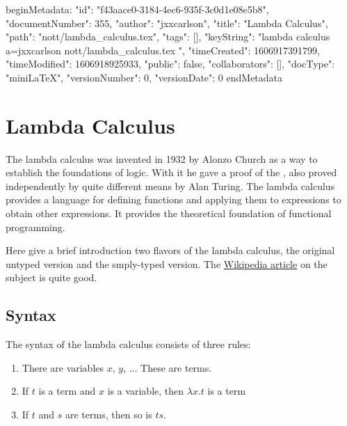 beginMetadata:
{
    "id": "f43aace0-3184-4ec6-935f-3c0d1e08e5b8",
    "documentNumber": 355,
    "author": "jxxcarlson",
    "title": "Lambda Calculus",
    "path": "nott/lambda_calculus.tex",
    "tags": [],
    "keyString": "lambda calculus a=jxxcarlson nott/lambda_calculus.tex ",
    "timeCreated": 1606917391799,
    "timeModified": 1606918925933,
    "public": false,
    "collaborators": [],
    "docType": "miniLaTeX",
    "versionNumber": 0,
    "versionDate": 0
}
endMetadata

\setcounter{section}{4}

\section{Lambda Calculus}


\innertableofcontents

The lambda calculus was invented in 1932 by Alonzo Church as a way to establish the foundations of logic.  With it he gave a proof of the , also proved independently by quite different means by Alan Turing.  The lambda calculus provides a language for defining functions and applying them to expressions to obtain other expressions. It  provides the theoretical foundation of functional programming.

Here give a brief introduction two flavors of the lambda calculus, the original untyped version and the smply-typed version.  The \href{https://en.wikipedia.org/wiki/Lambda_calculus}{Wikipedia article} on the subject is quite good.  

\subsection{Syntax}

The syntax of the lambda calculus consists of three rules:

\begin{enumerate}

\item There are variables $x$, $y$, ...  These are terms.

\item If $t$ is a term and $x$ is a variable, then $\lambda x.t$ is a term

\item If $t$ and $s$ are terms, then so is $ts$.

\end{enumerate}

